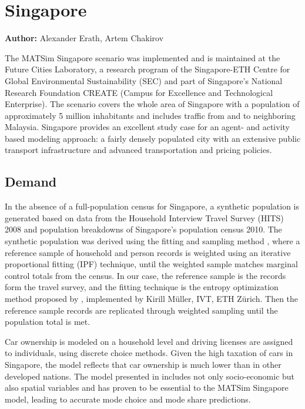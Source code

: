 \section{Singapore}
\label{sec:singapore}
\hfill \textbf{Author:} Alexander Erath, Artem Chakirov

The MATSim Singapore scenario \citet[][]{ErathEtAl_TechRep_FCL_forth} was implemented and is maintained at the Future Cities Laboratory, a research program of the Singapore-ETH Centre for Global Environmental Sustainability (SEC) and part of Singapore's National Research Foundation CREATE (Campus for Excellence and Technological Enterprise). The scenario covers the whole area of Singapore with a population of approximately 5 million inhabitants and includes traffic from and to neighboring Malaysia. Singapore provides an excellent study case for an agent- and activity based modeling approach: a fairly densely populated city with an extensive public transport infrastructure and advanced transportation and pricing policies. 

\subsection{Demand}
In the absence of a full-population census for Singapore, a synthetic population is generated based on data from the Household Interview Travel Survey (HITS) 2008 \citep[][]{Choi_JOUR_2010} and population breakdowns of Singapore’s population census 2010. The synthetic population was derived using the fitting and sampling method \citep{MuellerKAxhausen_TRB_2011}, where a reference sample of household and person records  is weighted using an iterative proportional fitting (IPF) technique, until the weighted sample matches marginal control totals from the census. In our case, the reference sample is the records form the travel survey, and the fitting technique is the entropy optimization method proposed by \citet[][]{BarGeraEtAl_TRB_2009}, implemented by Kirill Müller, IVT, ETH Zürich. Then the reference sample records are replicated through weighted sampling until the population total is met. 
 
Car ownership is modeled on a household level and driving licenses are assigned to individuals, using discrete choice methods. Given the high taxation of cars in Singapore, the model reflects that car ownership is much lower than in other developed nations. The model presented in \citet[][]{VanEggermondEtAl_IATBR_2012} includes not only socio-economic but also spatial variables and has proven to be essential to the MATSim Singapore model, leading to accurate mode choice and mode share predictions. 

